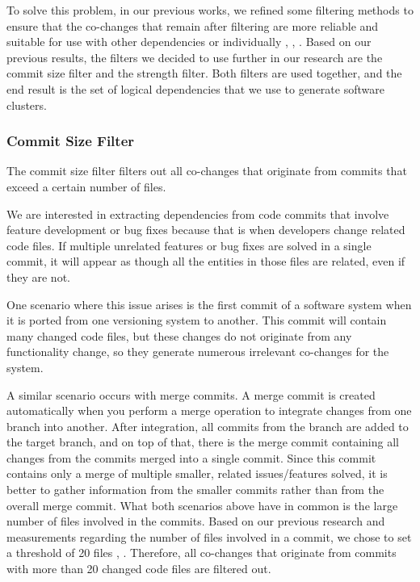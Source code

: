 \documentclass{ieeeaccess}
\begin{document}
To solve this problem, in our previous works, we refined some filtering methods to ensure that the co-changes that remain after filtering are more reliable and suitable for use with other dependencies or individually \cite{b4}, \cite{b5}, \cite{b6}. Based on our previous results, the filters we decided to use further in our research are the commit size filter and the strength filter. Both filters are used together, and the end result is the set of logical dependencies that we use to generate software clusters.

\subsubsection{Commit Size Filter}

The commit size filter filters out all co-changes that originate from commits that exceed a certain number of files.

We are interested in extracting dependencies from code commits that involve feature development or bug fixes because that is when developers change related code files. If multiple unrelated features or bug fixes are solved in a single commit, it will appear as though all the entities in those files are related, even if they are not.

One scenario where this issue arises is the first commit of a software system when it is ported from one versioning system to another. This commit will contain many changed code files, but these changes do not originate from any functionality change, so they generate numerous irrelevant co-changes for the system.

A similar scenario occurs with merge commits. A merge commit is created automatically when you perform a merge operation to integrate changes from one branch into another. After integration, all commits from the branch are added to the target branch, and on top of that, there is the merge commit containing all changes from the commits merged into a single commit. Since this commit contains only a merge of multiple smaller, related issues/features solved, it is better to gather information from the smaller commits rather than from the overall merge commit.
What both scenarios above have in common is the large number of files involved in the commits. Based on our previous research and measurements regarding the number of files involved in a commit, we chose to set a threshold of 20 files \cite{b4}, \cite{b5}. Therefore, all co-changes that originate from commits with more than 20 changed code files are filtered out.
\end{document}
